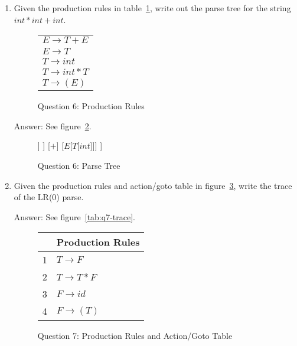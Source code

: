 \documentclass[10pt, oneside, letterpaper]{article}
\begin{document}
\begin{enumerate}
		\clearpage
		
		\item Given the production rules in table~\ref{tab:q6-prod-rules}, write out the parse tree for the string $int * int + int$.

\begin{figure}[!htb]
	\caption{Question 6: Production Rules}
	\label{tab:q6-prod-rules}
	\begin{center}
		\begin{tabular}{ l }
			$E \rightarrow T + E$ \\
			$E \rightarrow T$ \\
			$T \rightarrow int$ \\
			$T \rightarrow int * T$ \\
			$T \rightarrow (E)$
		\end{tabular}
	\end{center}
\end{figure}

	Answer: See figure~\ref{fig:q6-parse-tree}.

\begin{figure}[!htb]
	\caption{Question 6: Parse Tree}
	\label{fig:q6-parse-tree}
	\begin{center}
		\begin{forest}
			[$E$
				[$T$
					[$int$]
					[$*$]
					[$T$[$int$]]
				]
				[$+$]
				[$E$[$T$[$int$]]]
			]
		\end{forest}
	\end{center}
\end{figure}
		
		\clearpage
		
		\item Given the production rules and action/goto table in figure~\ref{tab:q7-productions-table}, write the trace of the LR(0) parse.

		Answer: See figure~\ref{tab:q7-trace}.

\begin{figure}[!htb]
	\caption{Question 7: Production Rules and Action/Goto Table}
	\label{tab:q7-productions-table}
	\begin{center}
		\begin{tabular}{ r | l }
			& Production Rules \\
			\hline
			1 & $T \rightarrow F$ \\ 
			2 & $T \rightarrow T*F$ \\
			3 & $F \rightarrow id$ \\
			4 & $F \rightarrow (T)$
		\end{tabular}
		

\end{center}
\end{figure}
\end{enumerate}
\end{document}
